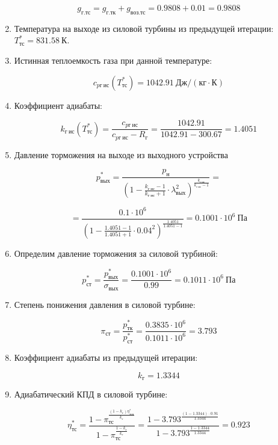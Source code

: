 \documentclass[a4paper,10pt]{article}
\begin{document}
\begin{enumerate}
	\[ g_{г.тс} = g_{г.тк} + g_{воз.тс} = 0.9808 + 0.01 = 0.9808 \]
	
	\item Температура на выходе из силовой турбины из предыдущей итерации: $ T_{тс}^* = 831.58\ К$.

	\item Истинная теплоемкость газа при данной температуре:
	
	\[ c_{pг\ ис} (T_{тс}^*) = 1042.91\ Дж/ (кг \cdot К) \]
	
	\item Коэффициент адиабаты:
	
	\[
	k_{г\ ис} (T_{тс}^*)  = \frac{ c_{pг\ ис} }{ c_{pг\ ис} - R_г } = 
			\frac{ 1042.91 }{ 1042.91 - 300.67 } = 
			1.4051
	\]
	
	\item Давление торможения на выходе из выходного устройства
	
	\[
	p_{вых}^* = \frac{ p_н 
				}{
					\left(  
						1 - \frac{ k_{г\ ис} - 1 }{ k_{г\ ис} + 1 } \cdot \lambda_{вых} ^ 2
					\right) 
						^ {
							\frac{ k_{г\ ис} }{ k_{г\ ис} - 1 }
						}
				} = 
	\]
	
	\[
	= \frac{ 0.1 \cdot 10^6 
		}{
			\left(  
				1 - \frac{ 1.4051 - 1 }{ 1.4051 + 1 } \cdot 0.04 ^ 2
			\right) 
				^ {
					\frac{ 1.4051 }{ 1.4051 - 1 }
				}
				} = 
		0.1001 \cdot 10^6\ Па
	\]
	
	\item Определим давление торможения за силовой турбиной:
	
	\[
	p_{ст}^* = \frac{ p_{вых}^* }{ \sigma_{вых} } = \frac{ 0.1001 \cdot 10^6 }{ 0.99 } = 
			0.1011 \cdot 10^6\ Па
	\]

	\item Степень понижения давления в силовой турбине:
	
	\[ \pi_{ст} = \frac{ p_{тк}^* }{ p_{ст}^* } =
			\frac{ 
				0.3835 \cdot 10^6 
			}{ 
				0.1011 \cdot 10^6 
			} = 
			3.793
	\]
	
	\item Коэффициент адиабаты из предыдущей итерации:
	
	\[ k_г = 1.3344 \]
	
	\item Адиабатический КПД в силовой турбине:
	
	\[
	\eta_{тс}^* = \frac{
					1 - \pi_{тс} ^ 
							{\frac{ (1 - k_г ) \eta_{тсп}^* }{ k_г }}
				}{
					1 - \pi_{тс} ^ 
							{\frac{ 1 - k_г }{ k_г }} 
				} = 
			\frac{
				1 - 3.793 ^ 
						{\frac{ (1 - 1.3344 ) \cdot 0.91 }{ 1.3344 }}
			}{
				1 - 3.793 ^ 
						{\frac{ 1 - 1.3344 }{ 1.3344 }} 
			} = 
		0.923
	\]	
	

\end{enumerate}
\end{document}
